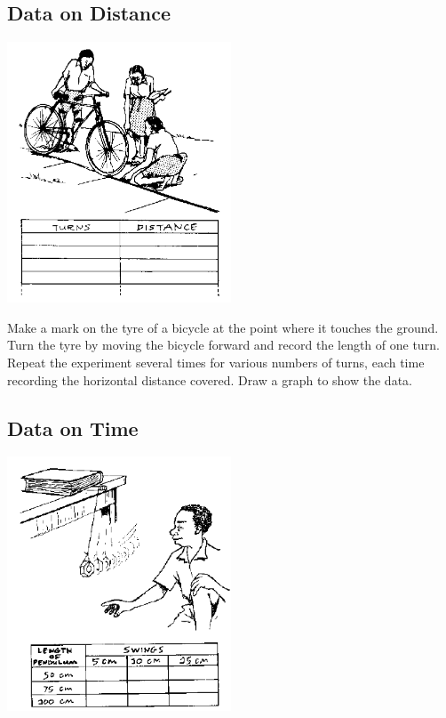 \begin{multicols}{2}
\vfill
\columnbreak

\subsection{Data on Distance}

\begin{center}
\includegraphics[width=0.5\textwidth]{./img/source/meas-distance.png}
\end{center}

Make a mark on the tyre of a bicycle at the point where it touches the ground. Turn the tyre by moving the bicycle forward and record the length of one turn. Repeat the experiment several times for various numbers of turns, each time recording the horizontal distance covered. Draw a graph to show the data.

\vfill
\columnbreak

\subsection{Data on Time}

\begin{center}
\includegraphics[width=0.5\textwidth]{./img/source/meas-time.png}
\end{center}


\end{multicols}
